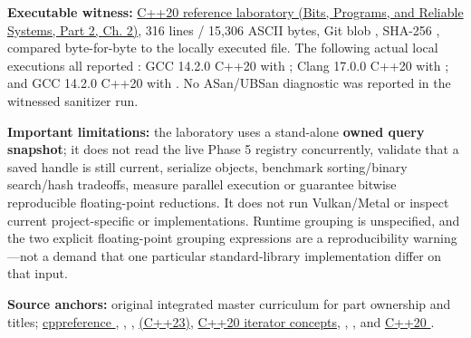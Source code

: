 \textbf{Executable witness:} \href{../01-Bits-Programs-and-Reliable-Systems-P02/main.pdf\#nameddest=source-file-c479bd493444d093f6c34898}{C++20 reference laboratory (Bits, Programs, and Reliable Systems, Part 2, Ch. 2)}, 316 lines / 15,306 ASCII bytes, Git blob , SHA-256 , compared byte-for-byte to the locally executed file. The following actual local executions all reported : GCC 14.2.0 C++20 with ; Clang 17.0.0 C++20 with ; and GCC 14.2.0 C++20 with . No ASan/UBSan diagnostic was reported in the witnessed sanitizer run.

\textbf{Important limitations:} the laboratory uses a stand-alone \textbf{owned query snapshot}; it does not read the live Phase 5 registry concurrently, validate that a saved handle is still current, serialize  objects, benchmark sorting/binary search/hash tradeoffs, measure parallel execution or guarantee bitwise reproducible floating-point reductions. It does not run Vulkan/Metal or inspect current project-specific  or  implementations. Runtime  grouping is unspecified, and the two explicit floating-point grouping expressions are a reproducibility warning---not a demand that one particular standard-library implementation differ on that input.

\textbf{Source anchors:} original integrated master curriculum for part ownership and titles; \href{https://en.cppreference.com/w/cpp/utility/optional}{cppreference }, \href{https://en.cppreference.com/w/cpp/utility/variant}{}, \href{https://en.cppreference.com/w/cpp/utility/any}{}, \href{https://en.cppreference.com/w/cpp/utility/expected}{ (C++23)}, \href{https://en.cppreference.com/w/cpp/iterator}{C++20 iterator concepts}, \href{https://en.cppreference.com/w/cpp/algorithm/lower_bound}{}, \href{https://en.cppreference.com/cpp/algorithm/reduce}{}, and \href{https://en.cppreference.com/cpp/container/unordered_map/erase_if}{C++20 }.

